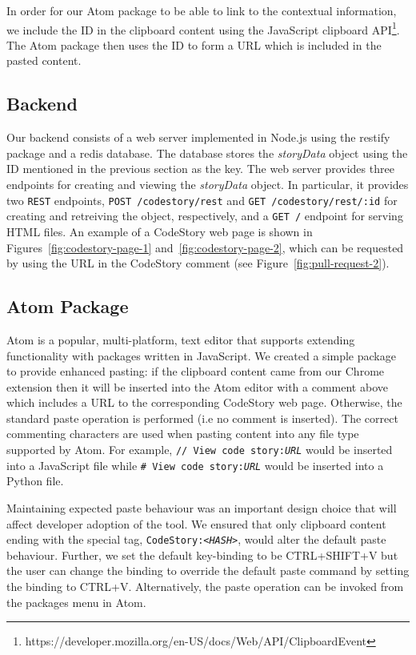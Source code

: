 \documentclass[../manifest.tex]{subfiles}
\begin{document}
In order for our Atom package to be able to link to the contextual information, we include the ID in the clipboard content using the JavaScript clipboard API\footnote{https://developer.mozilla.org/en-US/docs/Web/API/ClipboardEvent}. The Atom package then uses the ID to form a URL which is included in the pasted content.

\subsection{Backend}
Our backend consists of a web server implemented in Node.js using the restify package and a redis database. The database stores the \textit{storyData} object using the ID mentioned in the previous section as the key. The web server provides three endpoints for creating and viewing the \textit{storyData} object. In particular, it provides two \texttt{REST} endpoints, \texttt{POST /codestory/rest} and \texttt{GET /codestory/rest/:id} for creating and retreiving the object, respectively, and a \texttt{GET /} endpoint for serving HTML files. An example of a CodeStory web page is shown in Figures~\ref{fig:codestory-page-1} and~\ref{fig:codestory-page-2}, which can be requested by using the URL in the CodeStory comment (see Figure~\ref{fig:pull-request-2}).

\subsection{Atom Package}
Atom is a popular, multi-platform, text editor that supports extending functionality with packages written in JavaScript. We created a simple package to provide enhanced pasting: if the clipboard content came from our Chrome extension then it will be inserted into the Atom editor with a comment above which includes a URL to the corresponding CodeStory web page. Otherwise, the standard paste operation is performed (i.e no comment is inserted). The correct commenting characters are used when pasting content into any file type supported by Atom. For example, \texttt{// View code story:\textit{URL}} would be inserted into a JavaScript file while \texttt{\# View code story:\textit{URL}} would be inserted into a Python file.

Maintaining expected paste behaviour was an important design choice that will affect developer adoption of the tool. We ensured that only clipboard content ending with the special tag, \texttt{CodeStory:\textit{<HASH>}}, would alter the default paste behaviour. Further, we set the default key-binding to be CTRL+SHIFT+V but the user can change the binding to override the default paste command by setting the binding to CTRL+V. Alternatively, the paste operation can be invoked from the packages menu in Atom.
\end{document}

